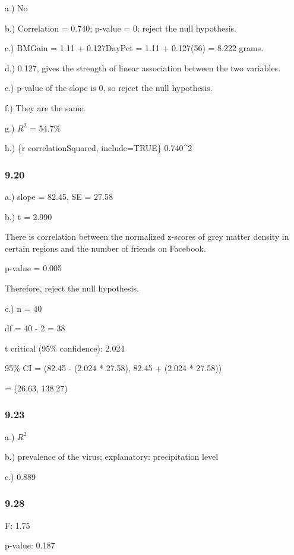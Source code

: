 \documentclass[
]{article}
\begin{document}
a.) No

b.) Correlation = 0.740; p-value = 0; reject the null hypothesis.

c.) BMGain = 1.11 + 0.127DayPct = 1.11 + 0.127(56) = 8.222 grams.

d.) 0.127, gives the strength of linear association between the two
variables.

e.) p-value of the slope is 0, so reject the null hypothesis.

f.) They are the same.

g.) \(R^2\) = 54.7\%

h.) \{r correlationSquared, include=TRUE\} 0.740\^{}2

\hypertarget{section-4}{%
\subsubsection{9.20}\label{section-4}}

a.) slope = 82.45, SE = 27.58

b.) t = 2.990

There is correlation between the normalized z-scores of grey matter
density in certain regions and the number of friends on Facebook.

p-value = 0.005

Therefore, reject the null hypothesis.

c.) n = 40

df = 40 - 2 = 38

t critical (95\% confidence): 2.024

95\% CI = (82.45 - (2.024 * 27.58), 82.45 + (2.024 * 27.58))

= (26.63, 138.27)

\hypertarget{section-5}{%
\subsubsection{9.23}\label{section-5}}

a.) \(R^2\)

b.) prevalence of the virus; explanatory: precipitation level

c.) 0.889

\hypertarget{section-6}{%
\subsubsection{9.28}\label{section-6}}

F: 1.75

p-value: 0.187
\end{document}
